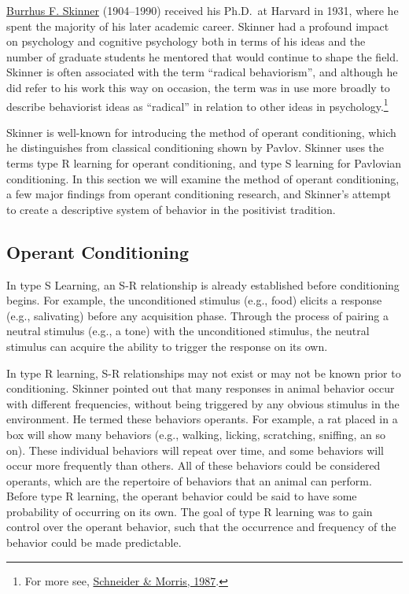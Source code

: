 \documentclass[
  oneside,
  12pt]{crumpbook}
\begin{document}
\href{https://en.wikipedia.org/wiki/B._F._Skinner}{Burrhus F. Skinner} (1904--1990) received his Ph.D.~at Harvard in 1931, where he spent the majority of his later academic career. Skinner had a profound impact on psychology and cognitive psychology both in terms of his ideas and the number of graduate students he mentored that would continue to shape the field. Skinner is often associated with the term ``radical behaviorism'', and although he did refer to his work this way on occasion, the term was in use more broadly to describe behaviorist ideas as ``radical'' in relation to other ideas in psychology.\footnote{For more see, \protect\hyperlink{ref-schneiderHistoryTermRadical1987}{Schneider \& Morris, 1987}.}

Skinner is well-known for introducing the method of operant conditioning, which he distinguishes from classical conditioning shown by Pavlov. Skinner uses the terms type R learning for operant conditioning, and type S learning for Pavlovian conditioning. In this section we will examine the method of operant conditioning, a few major findings from operant conditioning research, and Skinner's attempt to create a descriptive system of behavior in the positivist tradition.

\hypertarget{operant-conditioning}{%
\subsection{Operant Conditioning}\label{operant-conditioning}}

In type S Learning, an S-R relationship is already established before conditioning begins. For example, the unconditioned stimulus (e.g., food) elicits a response (e.g., salivating) before any acquisition phase. Through the process of pairing a neutral stimulus (e.g., a tone) with the unconditioned stimulus, the neutral stimulus can acquire the ability to trigger the response on its own.

In type R learning, S-R relationships may not exist or may not be known prior to conditioning. Skinner pointed out that many responses in animal behavior occur with different frequencies, without being triggered by any obvious stimulus in the environment. He termed these behaviors operants. For example, a rat placed in a box will show many behaviors (e.g., walking, licking, scratching, sniffing, an so on). These individual behaviors will repeat over time, and some behaviors will occur more frequently than others. All of these behaviors could be considered operants, which are the repertoire of behaviors that an animal can perform. Before type R learning, the operant behavior could be said to have some probability of occurring on its own. The goal of type R learning was to gain control over the operant behavior, such that the occurrence and frequency of the behavior could be made predictable.
\end{document}
